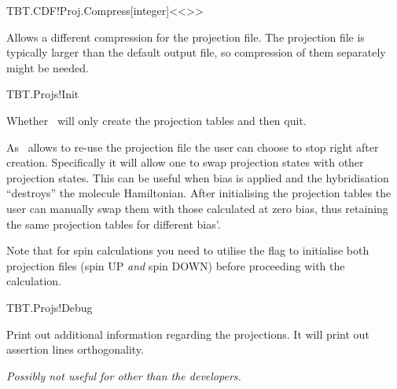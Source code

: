 \begin{fdfentry}{TBT.CDF!Proj.Compress}[integer]<{<>}>

  Allows a different compression for the projection file. The
  projection file is typically larger than the default output file, so
  compression of them separately might be needed.
  
\end{fdfentry}

\begin{fdflogicalF}{TBT.Projs!Init}

  Whether \tbtrans\ will only create the projection tables and then
  quit.

  As \tbtrans\ allows to re-use the projection file the user can
  choose to stop right after creation. Specifically it will allow one
  to swap projection states with other projection states. This can be
  useful when bias is applied and the hybridisation ``destroys'' the
  molecule Hamiltonian. After initialising the projection tables the
  user can manually swap them with those calculated at zero bias, thus
  retaining the same projection tables for different bias'.

  Note that for spin calculations you need to utilise the
   flag to initialise both projection files (spin UP
  \emph{and} spin DOWN) before proceeding with the calculation.
  
\end{fdflogicalF}

\begin{fdflogicalF}{TBT.Projs!Debug}

  Print out additional information regarding the projections. It will
  print out assertion lines orthogonality.

  \emph{Possibly not useful for other than the developers.}
  
\end{fdflogicalF}

